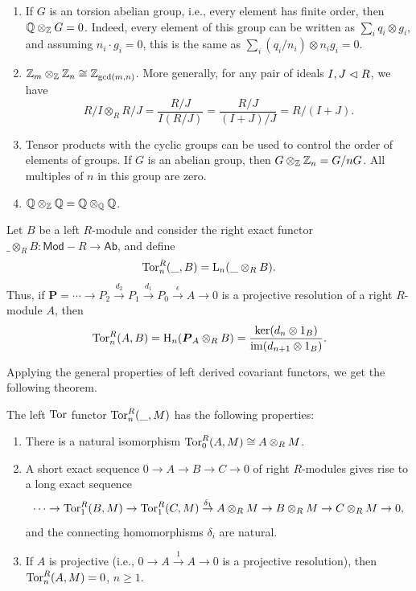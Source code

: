 \begin{example}\label{ex properties of ideals}
    \begin{enumerate}
        \item If $G$ is an torsion abelian group, i.e., every element has finite order, then $\mathbb{Q}\otimes_{\mathbb{Z}} G=0$. Indeed, every element of this group can be written as $\sum_i q_i\otimes g_i$, and assuming $n_i\cdot g_i=0$, this is the same as $\sum_i (q_i/n_i)\otimes n_ig_i=0$.
        \item $\mathbb{Z}_m\otimes_{\mathbb{Z}} \mathbb{Z}_n\cong \mathbb{Z}_{\gcd(m,n)}$. More generally, for any pair of ideals $I,J\vartriangleleft R$, we have
         \[R\slash I\otimes_R R\slash J=\frac{R\slash J}{I(R\slash J)}=\frac{R\slash J}{(I+J)/J}=R\slash(I+J).\]
        \item Tensor products with the cyclic groups can be used to control the order of elements of groups. If $G$ is an abelian group, then $G\otimes_{\mathbb{Z}} \mathbb{Z}_n=G\slash nG$. All multiples of $n$ in this group are zero.
        \item $\mathbb{Q}\otimes_{\mathbb{Z}}\mathbb{Q}=\mathbb{Q}\otimes_{\mathbb{Q}}\mathbb{Q}$. 
    \end{enumerate}
\end{example}


\begin{defn}
    Let $B$ be a left $R$-module and consider the right exact functor $\_\otimes_R B:\mathsf{Mod-}R\to \mathsf{Ab}$, and define
    \[\operatorname{Tor}_n^R(\_,B)=\mathrm{L}_n(\_\otimes_R B).\]
    Thus, if $\bm{P}=\cdots\to P_2\overset{d_2}{\to}P_1\overset{d_1}{\to}P_0\overset{\epsilon}{\to}A\to 0$ is a projective resolution of a right $R$-module $A$, then
    \[\operatorname{Tor}_n^R(A,B)=\mathrm{H}_n(\boldsymbol{P}_A\otimes_R B)=\frac{\ker(d_n\otimes 1_B)}{\operatorname{im}(d_{n+1}\otimes 1_B)}.\]
\end{defn}

Applying the general properties of left derived covariant functors, we get the following theorem.

\begin{thm}\label{thm Tor properties}
    The left $\operatorname{Tor}$ functor $\operatorname{Tor}_n^R(\_,M)$ has the following properties:
    \begin{enumerate}
        \item There is a natural isomorphism $\operatorname{Tor}_0^R(A,M)\cong A\otimes_R M$.
        \item A short exact sequence $0\to A\to B\to C\to 0$ of right $R$-modules gives rise to a long exact sequence 
        \[\cdots\to \operatorname{Tor}_1^R(B,M)\to \operatorname{Tor}_1^R(C,M)\overset{\delta_1}{\to} A\otimes_R M\to B\otimes_R M\to C\otimes_R M\to 0,\]
        and the connecting homomorphisms $\delta_i$ are natural.
        \item If $A$ is projective (i.e., $0\to A\overset{1}{\to} A\to 0$ is a projective resolution), then $\operatorname{Tor}_n^R(A,M)=0$, $n\geq 1$.
    \end{enumerate}
\end{thm}

